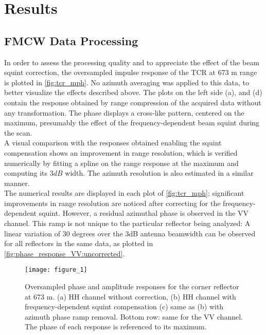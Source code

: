 \section{Results}\label{sec:results}
\subsection{FMCW Data Processing}\label{sec:res_SLC}
In order to assess the processing quality and to appreciate the effect of the beam squint correction,  the oversampled impulse response of the TCR at 673 m range is plotted in \autoref{fig:tcr_mph}. No azimuth averaging was applied to this data, to better visualize the effects described above. The plots on the left side (a), and (d) contain the response obtained by range compression of the acquired data without any transformation. The phase displays a cross-like pattern, centered on the maximum, presumably the effect of the frequency-dependent beam squint during the scan.\\ A visual comparison with the responses obtained enabling the squint compensation shows an improvement in range resolution, which is verified numerically by fitting a spline on the range response at the maximum and computing its $3 dB$ width. The azimuth resolution is also estimated in a similar manner.\\ The numerical results are displayed in each plot of \autoref{fig:tcr_mph}; significant improvements in range resolution are noticed after correcting for the frequency-dependent squint. However, a residual azimuthal phase is observed in the VV channel. This ramp is not unique to the particular reflector being analyzed: A linear variation of 30 degrees over the 3dB antenna beamwidth can be observed for all reflectors in the same data, as plotted in \autoref{fig:phase_response_VV:uncorrected}.
\begin{figure*}[ht]
	\centering
	\texttt{[image: figure\_1]}
	\caption{Oversampled phase and amplitude responses for the corner reflector at 673 m. (a) HH channel without correction, (b) HH channel with frequency-dependent squint compensation (c) same as (b) with azimuth phase ramp removal. Bottom row: same for the VV channel.
	The phase of each response is referenced to its maximum.}
	\label{fig:tcr_mph}
\end{figure*}

